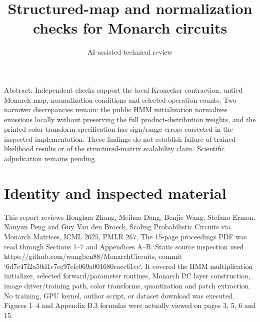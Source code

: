\documentclass[10pt]{article}
\title{Structured-map and normalization checks for Monarch circuits}
\author{AI-assisted technical review}
\date{}
\begin{document}
\maketitle
Abstract: Independent checks support the local Kronecker contraction, untied Monarch map, normalization conditions and selected operation counts. Two narrower discrepancies remain: the public HMM initialization normalizes emissions locally without preserving the full product-distribution weights, and the printed color-transform specification has sign/range errors corrected in the inspected implementation. These findings do not establish failure of trained likelihood results or of the structured-matrix scalability claim. Scientific adjudication remains pending.\par
\section*{Identity and inspected material}
This report reviews Honghua Zhang, Meihua Dang, Benjie Wang, Stefano Ermon, Nanyun Peng and Guy Van den Broeck, Scaling Probabilistic Circuits via Monarch Matrices, ICML 2025, PMLR 267. The 15-page proceedings PDF was read through Sections 1–7 and Appendices A–B. Static source inspection used https://github.com/wangben88/MonarchCircuits, commit `6d7c47f2a50d1c7ec97cfe069a001680eaec61cc`. It covered the HMM multiplication initializer, selected forward/parameter routines, Monarch PC layer construction, image driver/training path, color transforms, quantization and patch extraction. No training, GPU kernel, author script, or dataset download was executed. Figures 1–4 and Appendix B.3 formulas were actually viewed on pages 3, 5, 6 and 15.\par
\end{document}
